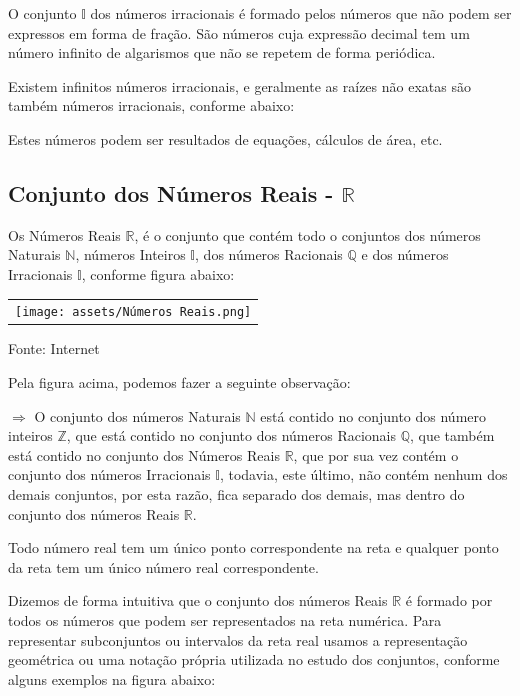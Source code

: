 \begin{multicols*}{2}
		O conjunto $\mathbb{I}$ dos números irracionais é formado pelos números que não podem ser expressos em forma de fração. São números cuja expressão decimal tem um número infinito de algarismos que não se repetem de forma periódica.
		
		Existem infinitos números irracionais, e geralmente as raízes não exatas são também números irracionais, conforme abaixo:
		
		
		Estes números podem ser resultados de equações, cálculos de área, etc.
		
		\subsection{Conjunto dos Números Reais - $\mathbb{R}$}
		
		Os Números Reais $\mathbb{R}$, é o conjunto que contém todo o conjuntos dos números Naturais $\mathbb{N}$, números Inteiros $\mathbb{I}$, dos números Racionais $\mathbb{Q}$ e dos números Irracionais $\mathbb{I}$, conforme figura abaixo:
		
		 \begin{tabular}{@{}c@{}}
       	 \texttt{[image: assets/Números Reais.png]}
   		 \end{tabular}
    
		Fonte: Internet 
		
		Pela figura acima, podemos fazer a seguinte observação:
		
		$\Rightarrow$ O conjunto dos números Naturais $\mathbb{N}$ está contido no conjunto dos número inteiros $\mathbb{Z}$, que está contido no conjunto dos números Racionais $\mathbb{Q}$, que também está contido no conjunto dos Números Reais $\mathbb{R}$, que por sua vez contém o conjunto dos números Irracionais $\mathbb{I}$, todavia, este último, não contém nenhum dos demais conjuntos, por esta razão, fica separado dos demais, mas dentro do conjunto dos números Reais $\mathbb{R}$.
		
		Todo número real tem um único ponto correspondente na reta e qualquer ponto da reta tem um único número real correspondente.
		
		Dizemos de forma intuitiva que o conjunto dos números Reais $\mathbb{R}$ é formado por todos os números que podem ser representados na reta numérica. Para representar subconjuntos ou intervalos da reta real usamos a representação geométrica ou uma notação própria utilizada no estudo dos conjuntos, conforme alguns exemplos na figura abaixo:
		

\end{multicols*}
